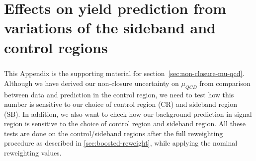 \chapter{Effects on yield prediction from variations of the sideband and control regions}
\label{app:boosted-syst-CRSB_Definition_Variation}

\paragraph{}
This Appendix is the supporting material for section~\ref{sec:non-closure-mu-qcd}. 
Although we have derived our non-closure uncertainty on $\mu_{QCD}$ from comparison between data and prediction in the control region, we need to test how this number is sensitive to our choice of control region (CR) and sideband region (SB). In addition, we also want to check how our background prediction in signal region is sensitive to the choice of control region and sideband region. All these tests are done on the control/sideband regions after the full reweighting procedure as described in \ref{sec:boosted-reweight}, while applying the nominal reweighting values.

